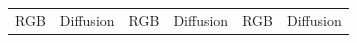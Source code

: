\begin{figure}[htp!]
    \centering
    \begin{tabularx}{\textwidth}{>{\centering\arraybackslash}X >{\centering\arraybackslash}X >{\centering\arraybackslash}X >{\centering\arraybackslash}X >{\centering\arraybackslash}X >{\centering\arraybackslash}X}
        RGB                                                                                                              & Diffusion                                                                               & RGB                                                                                                              & Diffusion                                                                               & RGB                                                                                                              & Diffusion                                                                               \\

\end{tabularx}
\end{figure}
